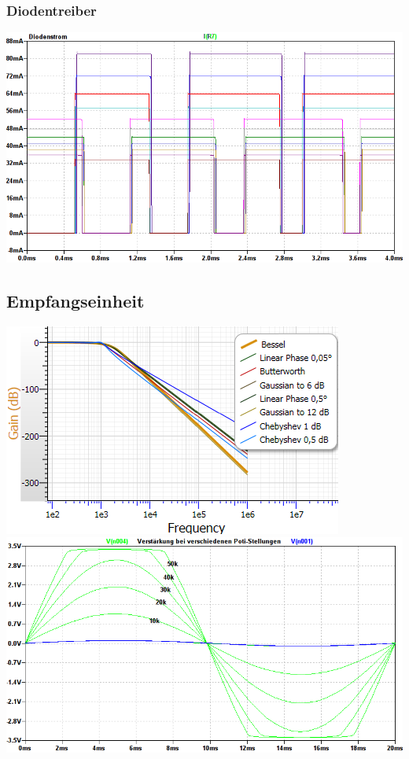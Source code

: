 \subsubsection{Diodentreiber}
\includegraphics[scale=0.5]{gfx/simTx/DiodeCurrent.png}
\subsection{Empfangseinheit}
\includegraphics[scale=1]{gfx/simRx/characteristics.png}
\includegraphics[scale=0.5]{gfx/simRx/amplification.png}